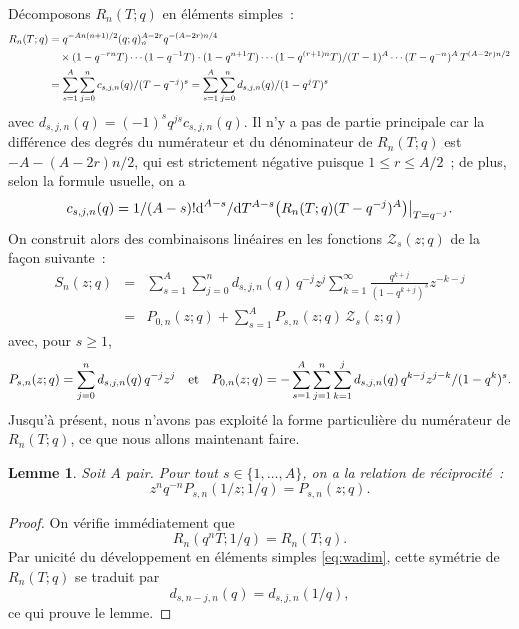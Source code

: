 \documentclass[12pt]{amsart}
\newcommand{\io}{\infty}
\newcommand{\dd}{\textup{d}}
\newtheorem{lem}{Lemme}
\theoremstyle{remark}
\numberwithin{equation}{section}
\begin{document}
D{\'e}composons 
$R_n(T;q)$ en {\'e}l{\'e}ments simples~: 
\begin{align} \label{eq:wadim}
R_n(T ; q)
&=q^{-An(n+1)/2}(q;q)_n^{A-2r}q^{-(A-2r)n/4}\\
\notag
&\quad
\times \frac{(1-q^{-rn}T)\cdots(1-q^{-1}T)\cdot(1-q^{n+1}T)\cdots
(1-q^{(r+1)n}T)}{(T-1)^{A}\cdots (T-q^{-n})^{A}}\,T^{(A-2r)n/2}\\
\notag
&= \sum_{s=1}^A\sum_{j=0}^n \frac{c_{s,j,n}(q)}{(T-q^{-j})^{s}}=
\sum_{s=1}^A\sum_{j=0}^n \frac{d_{s,j,n}(q)}{(1-q^jT)^{s}}
\end{align}
avec $d_{s,j,n}(q)=(-1)^sq^{js}c_{s,j,n}(q)$. Il n'y a pas de 
partie principale car la diff{\'e}rence des
degr{\'e}s du num{\'e}rateur et du d{\'e}nominateur de $R_n(T;q)$
est $-A-(A-2r)n/2$,
qui est strictement n{\'e}gative puisque 
$1\le r\le A/2$~; de plus,  selon la formule usuelle, on a
\begin{equation} \label{eq:c} 
c_{s,j,n}(q)=\frac{1}{(A-s)!}
\frac{\dd^{A-s}}{\dd T^{A-s}}\bigl(R_n(T;q)(T-q^{-j})^A\bigr)
\big\vert_{T=q^{-j}}.
\end{equation}
On construit alors des combinaisons lin{\'e}aires en
les fonctions $\mathcal{Z}_s(z;q)$ de la fa{\c c}on suivante~:
\begin{eqnarray*}
S_n(z;q)&=&\sum_{s=1}^A\sum_{j=0}^n
d_{s,j,n}(q)\,q^{-j}z^j\sum_{k=1}^{\io}\frac{q^{k+j}}{(1-q^{k+j})^s}z^{-k-j}\\
&=&P_{0,n}(z;q)+\sum_{s=1}^A P_{s,n}(z;q)\,\mathcal{Z}_s(z;q)
\end{eqnarray*}
avec, pour $s\ge 1$, 
$$
P_{s,n}(z;q)=\sum_{j=0}^n d_{s,j,n}(q)\,q^{-j}z^j
\quad \textup{et}\quad
P_{0,n}(z;q)=-\sum_{s=1}^A
\sum_{j=1}^n
\sum_{k=1}^j d_{s,j,n}(q)\,q^{k-j}
\frac{z^{j-k}}{(1-q^{k})^s}.
$$
Jusqu'{\`a} pr{\'e}sent, nous n'avons pas exploit{\'e} la forme particuli{\`e}re
du num{\'e}rateur de $R_n(T;q)$, ce que nous allons maintenant faire. 

\begin{lem}\label{lem:sympoly}
Soit $A$ pair.
Pour tout $s\in\{ 1, \ldots, A\}$, on a la relation de
r{\'e}ciprocit{\'e}~: 
$$
z^nq^{-n}P_{s,n}(1/z;1/q)=P_{s,n}(z;q).
$$
\end{lem}
\begin{proof} On v{\'e}rifie imm{\'e}diatement que 
$$
R_n(q^nT;1/q)=R_n(T;q). 
$$
Par unicit{\'e} du d{\'e}veloppement en {\'e}l{\'e}ments simples
\eqref{eq:wadim}, cette sym{\'e}trie de 
$R_n(T ; q)$ se traduit par 
$$
d_{s,n-j,n}(q)=d_{s,j,n}(1/q),
$$
ce qui prouve le lemme.
\end{proof}
\end{document}
